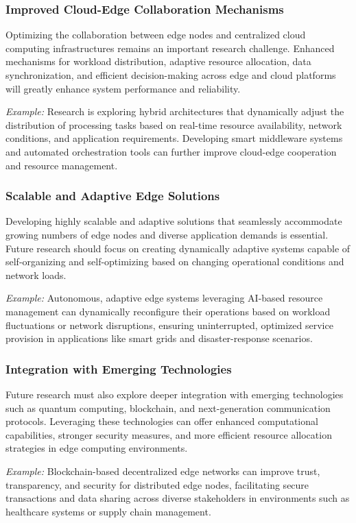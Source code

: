 \documentclass[runningheads]{llncs}
\begin{document}
\subsubsection{Improved Cloud-Edge Collaboration Mechanisms}
Optimizing the collaboration between edge nodes and centralized cloud computing infrastructures remains an important research challenge. Enhanced mechanisms for workload distribution, adaptive resource allocation, data synchronization, and efficient decision-making across edge and cloud platforms will greatly enhance system performance and reliability.

\textit{Example:} Research is exploring hybrid architectures that dynamically adjust the distribution of processing tasks based on real-time resource availability, network conditions, and application requirements. Developing smart middleware systems and automated orchestration tools can further improve cloud-edge cooperation and resource management.

\subsubsection{Scalable and Adaptive Edge Solutions}
Developing highly scalable and adaptive solutions that seamlessly accommodate growing numbers of edge nodes and diverse application demands is essential. Future research should focus on creating dynamically adaptive systems capable of self-organizing and self-optimizing based on changing operational conditions and network loads.

\textit{Example:} Autonomous, adaptive edge systems leveraging AI-based resource management can dynamically reconfigure their operations based on workload fluctuations or network disruptions, ensuring uninterrupted, optimized service provision in applications like smart grids and disaster-response scenarios.

\subsubsection{Integration with Emerging Technologies}
Future research must also explore deeper integration with emerging technologies such as quantum computing, blockchain, and next-generation communication protocols. Leveraging these technologies can offer enhanced computational capabilities, stronger security measures, and more efficient resource allocation strategies in edge computing environments.

\textit{Example:} Blockchain-based decentralized edge networks can improve trust, transparency, and security for distributed edge nodes, facilitating secure transactions and data sharing across diverse stakeholders in environments such as healthcare systems or supply chain management.
\end{document}
